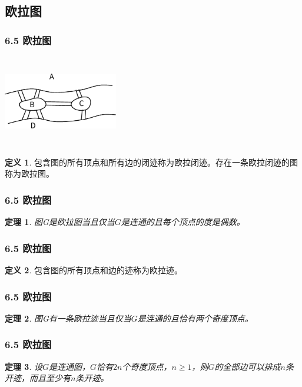 \documentclass{beamer}
\newtheorem{Thm}{定理}[section]
\theoremstyle{definition}
\newtheorem{Def}{定义}[section]
\theoremstyle{example}
\begin{document}
\begin{CJK*}{UTF8}{gbsn}
\section{欧拉图}
\begin{frame}
  \frametitle{6.5 欧拉图}
\centering
\includegraphics[width=5cm,height=4cm]{konigsberg} 
    \pause
  \begin{Def}
    包含图的所有顶点和所有边的闭迹称为\alert{欧拉闭迹}。存在一条欧拉闭迹的图称为\alert{欧拉图}。
  \end{Def}

\end{frame}


\begin{frame}
  \frametitle{6.5 欧拉图}
  \begin{Thm}
    图G是欧拉图当且仅当$G$是连通的且每个顶点的度是偶数。
  \end{Thm}

\end{frame}

\begin{frame}
  \frametitle{6.5 欧拉图}
  \begin{Def}
    包含图的所有顶点和边的迹称为欧拉迹。
  \end{Def}

\end{frame}

\begin{frame}
  \frametitle{6.5 欧拉图}
  \begin{Thm}
    图G有一条欧拉迹当且仅当$G$是连通的且恰有两个奇度顶点。
  \end{Thm}

\end{frame}


\begin{frame}
  \frametitle{6.5 欧拉图}
  \begin{Thm}
    设$G$是连通图，$G$恰有$2n$个奇度顶点，$n \geq 1$，则$G$的全部边可以排成$n$条开迹，而且至少有$n$条开迹。
  \end{Thm}

\end{frame}


\end{CJK*}
\end{document}
